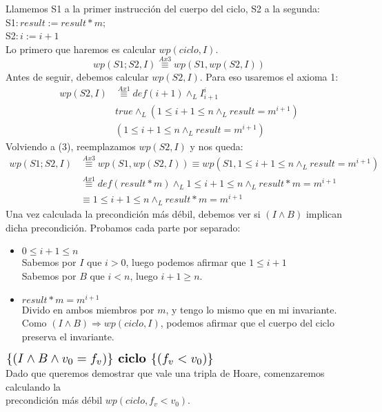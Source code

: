 \documentclass{article}
\begin{document}
\begin{enumerate}[label=\alph*)]
	Llamemos S1 a la primer instrucción del cuerpo del ciclo, S2 a la segunda:\\
	S1$: result:=result*m;$\\
	S2$: i:=i+1$\\
	Lo primero que haremos es calcular $wp(ciclo,I)$.
	\begin{equation}wp(S1;S2,I)\stackrel{Ax3}{\equiv}wp(S1,wp(S2,I))\end{equation}
	Antes de seguir, debemos calcular $wp(S2,I)$. Para eso usaremos el axioma 1:
	\begin{align*}
	wp(S2,I)&\stackrel{Ax1}{\equiv}def(i+1)\wedge_L I_{i+1}^{i}\\
		&true\wedge_L (1\leq i+1\leq n \wedge_L result=m^{i+1})\\
		& (1\leq i+1\leq n \wedge_L result=m^{i+1})
	\end{align*}
	Volviendo a (3), reemplazamos $wp(S2,I)$ y nos queda:
	\begin{align*}
	wp(S1;S2,I)&\stackrel{Ax3}{\equiv}wp(S1,wp(S2,I))\equiv wp(S1,1\leq i+1\leq n \wedge_L result=m^{i+1})\\
		&\stackrel{Ax1}{\equiv}def(result*m)\wedge_L 1\leq i+1\leq n \wedge_L result*m=m^{i+1}\\
		&\equiv 1\leq i+1\leq n \wedge_L result*m=m^{i+1}
	\end{align*}
	Una vez calculada la precondición más débil, debemos ver si $(I\wedge B)$ implican dicha precondición. Probamos cada
	parte por separado:
	\begin{itemize}
		\item $ 0\leq i+1\leq n$\smallskip \\
		Sabemos por $I$ que $ i>0$, luego podemos afirmar que $1\leq i+1$\\
		Sabemos por $B$ que $i<n$, luego $i+1\geq n$.
		\item $result*m=m^{i+1}$\smallskip \\
		Divido en ambos miembros por $m$, y tengo lo mismo que en mi invariante.\smallskip \\
		Como $(I\wedge B) \Rightarrow wp(ciclo,I)$, podemos afirmar que el cuerpo del ciclo preserva el invariante.
	\end{itemize}
	$\scalebox{1.3}{$\{(I\wedge B\wedge v_0=f_v)\}\textbf{ ciclo }\{(f_v<v_0)\}$}$\medskip \\
	Dado que queremos demostrar que vale una tripla de Hoare, comenzaremos calculando la\\ precondición más débil $wp(ciclo,f_v<v_0)$.
	\begin{align*}

\end{align*}
\end{enumerate}
\end{document}

